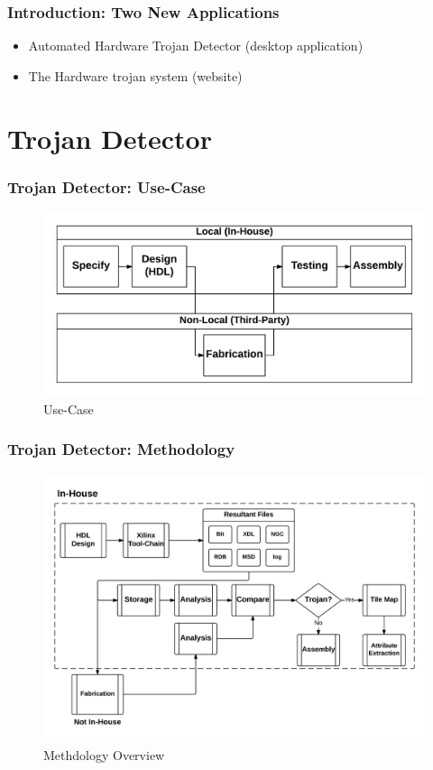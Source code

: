 \documentclass{beamer}
\begin{document}
\begin{frame}
	\frametitle{Introduction: Two New Applications}
	\begin{itemize}
		\item Automated Hardware Trojan Detector (desktop application)
		\item The Hardware trojan system (website)
	\end{itemize}
\end{frame}

\section{Trojan Detector}
\begin{frame}
	\frametitle{Trojan Detector: Use-Case}
	\begin{figure}
		\centering
		\includegraphics[width=0.7\linewidth]{../NewAutomated_V4/Figures/Concept}
		\caption[Use-Case]{Use-Case}
		\label{fig:Concept}
	\end{figure}
\end{frame}

\begin{frame}
	\frametitle{Trojan Detector: Methodology}
	\begin{figure}
		\centering
		\includegraphics[width=0.7\linewidth]{../Thesis/Figures/methodologyOverview}
		\caption[Methdology Overview]{Methdology Overview}
		\label{fig:methodologyOverview}
	\end{figure}
\end{frame}
\end{document}
